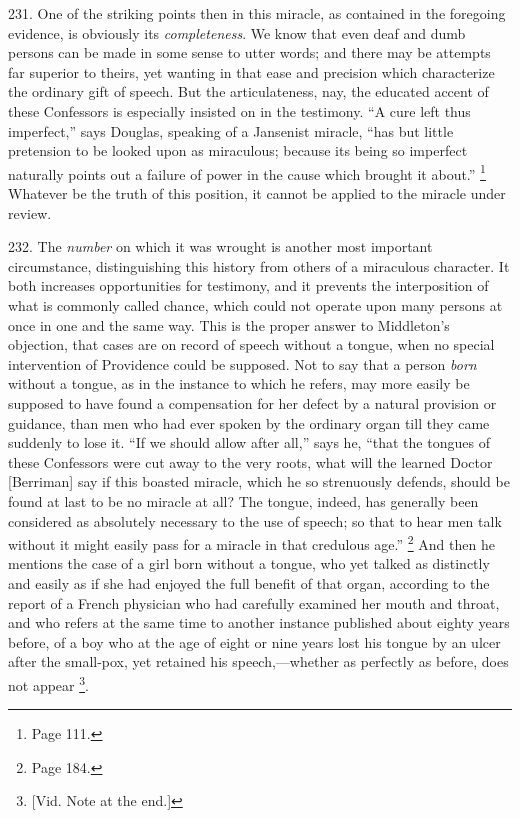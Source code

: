 231.
One of the striking points then in this miracle, as contained in the
foregoing evidence, is obviously its \emph{completeness}. We know that
even deaf and dumb persons can be made in some sense to utter words;
and there may be attempts far superior to theirs, yet wanting in that
ease and precision which characterize the ordinary gift of speech. But
the articulateness, nay, the educated accent of these Confessors is
especially insisted on in the testimony. ``A cure left thus imperfect,''
says Douglas, speaking of a Jansenist miracle, ``has but little
pretension to be looked upon as miraculous; because its being so
imperfect naturally points out a failure of power in the cause
which brought it about.'' \footnote{Page 111.}
Whatever be the truth of this position, it cannot be applied to the
miracle under review.

232.
The \emph{number} on which it was wrought is another most important
circumstance, distinguishing this history from others of a miraculous
character. It both increases opportunities for testimony, and it
prevents the interposition of what is commonly called chance, which
could not operate upon many persons at once in one and the same way.
This is the proper answer to Middleton's objection, that cases are on
record of speech without a tongue, when no special intervention of
Providence could be supposed. Not to say that a person \emph{born} without a
tongue, as in the instance to which he refers, may more easily be
supposed to have found a compensation for her defect by a natural
provision or guidance, than men who had ever spoken by the ordinary
organ till they came suddenly to lose it. ``If we should allow after
all,'' says he, ``that the tongues of these Confessors were cut away to
the very roots, what will the learned Doctor [Berriman] say if this
boasted miracle, which he so strenuously defends, should be found at
last to be no miracle at all? The tongue, indeed, has generally been
considered as absolutely necessary to the use of speech; so that to
hear men talk without it might easily pass for a miracle in that
credulous age.'' \footnote{Page 184.}
And then he mentions the case of a girl born without a tongue, who yet
talked as distinctly and easily as if she had enjoyed the full benefit
of that organ, according to the report of a French physician who had
carefully examined her mouth and throat, and who refers at the same
time to another instance published about eighty years before, of a boy
who at the age of eight or nine years lost his tongue by an ulcer
after the small-pox, yet retained his speech,—whether as perfectly
as before, does not appear \footnote{[Vid. Note at the end.]}.

